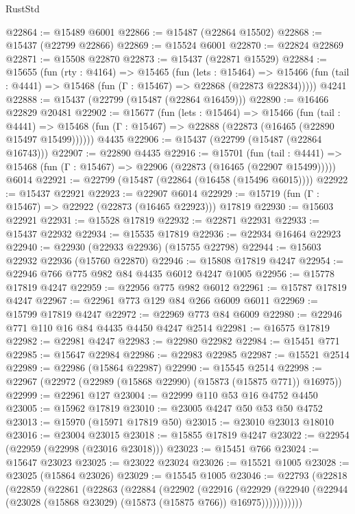 \begin{lexlean}{RustStd}
\begin{coremodule}
@22864 := @15489 @6001
@22866 := @15487 (@22864 @15502)
@22868 := @15437 (@22799 @22866)
@22869 := @15524 @6001
@22870 := @22824 @22869
@22871 := @15508 @22870
@22873 := @15437 (@22871 @15529)
@22884 := @15655
    (fun (rty : @4164) =>
    @15465
      (fun (lets : @15464) =>
      @15466 (fun (tail : @4441) => @15468 (fun (Γ : @15467) => @22868 (@22873 @22834)))))
    @4241
@22888 := @15437 (@22799 (@15487 (@22864 @16459)))
@22890 := @16466 @22829 @20481
@22902 := @15677
    (fun (lets : @15464) =>
    @15466
      (fun (tail : @4441) =>
      @15468 (fun (Γ : @15467) => @22888 (@22873 (@16465 (@22890 @15497 @15499))))))
    @4435
@22906 := @15437 (@22799 (@15487 (@22864 @16743)))
@22907 := @22890 @4435
@22916 := @15701
    (fun (tail : @4441) => @15468 (fun (Γ : @15467) => @22906 (@22873 (@16465 (@22907 @15499)))))
    @6014
@22921 := @22799 (@15487 (@22864 (@16458 (@15496 @6015))))
@22922 := @15437 @22921
@22923 := @22907 @6014
@22929 := @15719 (fun (Γ : @15467) => @22922 (@22873 (@16465 @22923))) @17819
@22930 := @15603 @22921
@22931 := @15528 @17819
@22932 := @22871 @22931
@22933 := @15437 @22932
@22934 := @15535 @17819
@22936 := @22934 @16464 @22923
@22940 := @22930 (@22933 @22936) (@15755 @22798)
@22944 := @15603 @22932 @22936 (@15760 @22870)
@22946 := @15808 @17819 @4247
@22954 := @22946 @766 @775 @982 @84 @4435 @6012 @4247 @1005
@22956 := @15778 @17819 @4247
@22959 := @22956 @775 @982 @6012
@22961 := @15787 @17819 @4247
@22967 := @22961 @773 @129 @84 @266 @6009 @6011
@22969 := @15799 @17819 @4247
@22972 := @22969 @773 @84 @6009
@22980 := @22946 @771 @110 @16 @84 @4435 @4450 @4247 @2514
@22981 := @16575 @17819
@22982 := @22981 @4247
@22983 := @22980 @22982
@22984 := @15451 @771
@22985 := @15647 @22984
@22986 := @22983 @22985
@22987 := @15521 @2514
@22989 := @22986 (@15864 @22987)
@22990 := @15545 @2514
@22998 := @22967 (@22972 (@22989 (@15868 @22990) (@15873 (@15875 @771)) @16975))
@22999 := @22961 @127
@23004 := @22999 @110 @53 @16 @4752 @4450
@23005 := @15962 @17819
@23010 := @23005 @4247 @50 @53 @50 @4752
@23013 := @15970 (@15971 @17819 @50)
@23015 := @23010 @23013 @18010
@23016 := @23004 @23015
@23018 := @15855 @17819 @4247
@23022 := @22954 (@22959 (@22998 (@23016 @23018)))
@23023 := @15451 @766
@23024 := @15647 @23023
@23025 := @23022 @23024
@23026 := @15521 @1005
@23028 := @23025 (@15864 @23026)
@23029 := @15545 @1005
@23046 := @22793
    (@22818
      (@22859
        (@22861
          (@22863
            (@22884
              (@22902
                (@22916
                  (@22929
                    (@22940 (@22944 (@23028 (@15868 @23029) (@15873 (@15875 @766)) @16975)))))))))))

\end{coremodule}
\end{lexlean}
